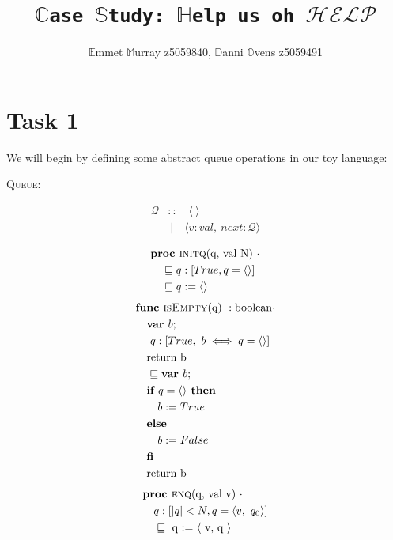 \documentclass[a4paper]{scrartcl}
\title{\texttt{$\mathbb{C}$ase $\mathbb{S}$tudy: $\mathbb{H}$elp us oh $\mathcal{HELP}$}}
\author{$\mathbb{E}$mmet $\mathbb{M}$urray z5059840, $\mathbb{D}$anni $\mathbb{O}$vens z5059491}
\newcommand{\refinedby}{\sqsubseteq} %
\begin{document}
\maketitle
\section*{Task 1}
We will begin by defining some abstract queue operations in our toy language:\\
%
\begin{center}
{\LARGE{\textsc{Queue:}}\normalsize}
\end{center}
\begin{align*}
\mathcal{Q} &:: \quad \langle ~ \rangle \\
&~| \quad \langle v : val,~\mathit{next} : \mathcal{Q} \rangle \\
\end{align*}
%
\begin{align*}
& \textbf{proc }\text{\textsc{initq}(q, val N) } \cdot \\ 
    &\quad \refinedby  q : [True, q = \langle \rangle ] \\
    & \quad \refinedby q := \langle \rangle \\
\end{align*}
\begin{align*}
& \textbf{func }\text{\textsc{isEmpty}(q) } : \text{boolean} \cdot  \\ 
	& \quad \textbf{var } b; \\
	& \quad ~ q : [True,~b \iff q = \langle \rangle  ] \\
	& \quad \text{return b} \\
	& \quad \refinedby \textbf{var } b; \\
	& \quad \textbf{if } q = \langle \rangle \textbf{ then} \\
	& \quad \quad b := True \\
	& \quad \textbf{else} \\
	& \quad \quad b := False \\
	& \quad \textbf{fi} \\
	& \quad \text{return b} \\
\end{align*}
\begin{align*}
& \textbf{proc }\text{\textsc{enq}(q, val v) } \cdot\\
	& \quad q : \left[|q| < N, q = \langle v,~q_0 \rangle \right] \\
    & \quad \refinedby \text{ q := $\langle$ v, q $\rangle$}\\
\end{align*}
\end{document}
